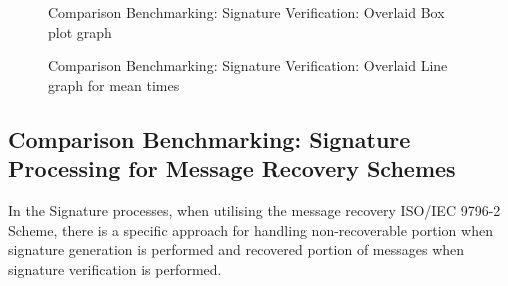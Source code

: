 \documentclass[]{final_report}
\theoremstyle{definition}
\begin{document}
\begin{figure}[H]
\begin{minipage}{0.7\textwidth}
        \caption{Comparison Benchmarking: Signature Verification: Overlaid Box plot graph}
        \label{fig:image2} 
    \end{minipage}
     \begin{minipage}{0.7\textwidth}
        \centering
        \caption{Comparison Benchmarking: Signature Verification: Overlaid Line graph for mean times}
        \label{fig:image2}
    \end{minipage}
\end{figure}

\subsection{Comparison Benchmarking: Signature Processing for Message Recovery Schemes}

In the Signature processes, when utilising the message recovery ISO/IEC 9796-2 Scheme, there is a specific approach for handling non-recoverable portion when signature generation is performed and recovered portion of messages when signature verification is performed.
\end{document}
